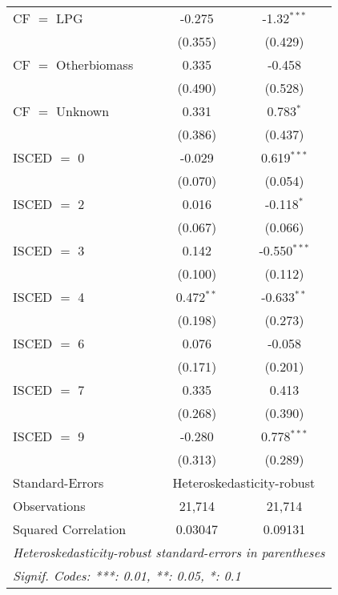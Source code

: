 \begin{table}[htbp!]
\begin{adjustbox}{width = 1\textwidth, max height = 0.95\textheight, center}
\begin{threeparttable}[b]
\begin{tabular}{lcc}
            CF $=$ LPG           & -0.275         & -1.32$^{***}$\\   
                                 & (0.355)        & (0.429)\\   
            CF $=$ Otherbiomass  & 0.335          & -0.458\\   
                                 & (0.490)        & (0.528)\\   
            CF $=$ Unknown       & 0.331          & 0.783$^{*}$\\   
                                 & (0.386)        & (0.437)\\   
            ISCED $=$ 0          & -0.029         & 0.619$^{***}$\\   
                                 & (0.070)        & (0.054)\\   
            ISCED $=$ 2          & 0.016          & -0.118$^{*}$\\   
                                 & (0.067)        & (0.066)\\   
            ISCED $=$ 3          & 0.142          & -0.550$^{***}$\\   
                                 & (0.100)        & (0.112)\\   
            ISCED $=$ 4          & 0.472$^{**}$   & -0.633$^{**}$\\   
                                 & (0.198)        & (0.273)\\   
            ISCED $=$ 6          & 0.076          & -0.058\\   
                                 & (0.171)        & (0.201)\\   
            ISCED $=$ 7          & 0.335          & 0.413\\   
                                 & (0.268)        & (0.390)\\   
            ISCED $=$ 9          & -0.280         & 0.778$^{***}$\\   
                                 & (0.313)        & (0.289)\\   
            \midrule 
            Standard-Errors & \multicolumn{2}{c}{Heteroskedasticity-robust} \\ 
            Observations         & 21,714         & 21,714\\  
            Squared Correlation  & 0.03047        & 0.09131\\  
            \midrule \midrule
            \multicolumn{3}{l}{\emph{Heteroskedasticity-robust standard-errors in parentheses}}\\
            \multicolumn{3}{l}{\emph{Signif. Codes: ***: 0.01, **: 0.05, *: 0.1}}\\
         \end{tabular}
         

\end{threeparttable}
\end{adjustbox}
\end{table}
